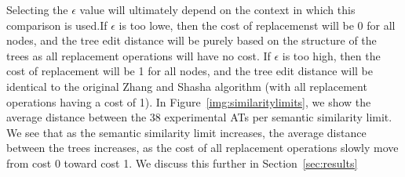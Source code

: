 
Selecting the $\epsilon$ value will ultimately depend on the context in which this comparison is used.If $\epsilon$ is too lowe, then the cost of replacemenst will be 0 for all nodes, and the tree edit distance will be purely based on the structure of the trees as all replacement operations will have no cost. If $\epsilon$ is too high, then the cost of replacement will be 1 for all nodes, and the tree edit distance will be identical to the original Zhang and Shasha algorithm (with all replacement operations having a cost of 1). In Figure~\ref{img:similaritylimits}, we show the average distance between the 38 experimental ATs per semantic similarity limit. We see that as the semantic similarity limit increases, the average distance between the trees increases, as the cost of all replacement operations slowly move from cost 0 toward cost 1. We discuss this further in Section~\ref{sec:results}